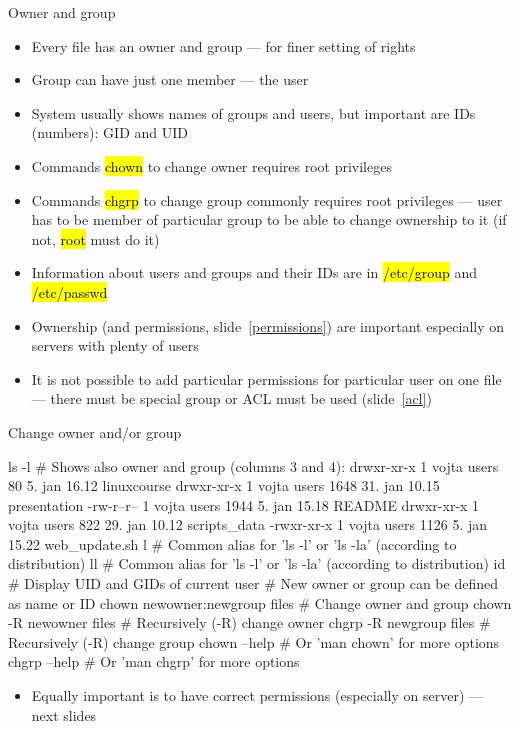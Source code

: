 \documentclass[compress, ucs, xelatex, 11pt, xcolor=svgnames, aspectratio=169,
	hyperref={
		bookmarks=true,
		unicode=true,
		colorlinks=true,
		pdftitle={Linux, command line and MetaCentrum},
		plainpages=false,
		pdfauthor={Vojtech Zeisek},
		pdfsubject={Course about use of Linux command line, writing shell scripts and using MetaCentrum of CESNET},
		pdfcreator={XeLaTeX},
		pdfkeywords={Linux, GNU, BASH, shell, command line, MetaCentrum},
		linkcolor=DarkRed, %
		anchorcolor=DarkBlue, %
		citecolor=Indigo, %
		filecolor=NavyBlue, %
		menucolor=DarkMagenta, %
		urlcolor=DarkBlue, %
		pdftex},
	url={hyphens, lowtilde} %
	]{beamer}
\renewcommand{\texttt}[1]{\hl{\ttfamily #1}}
\begin{document}
\begin{frame}{Owner and group}
	\begin{itemize}
		\item Every file has an owner and group --- for finer setting of rights
		\item Group can have just one member --- the user
		\item System usually shows names of groups and users, but important are IDs (numbers): GID and UID
		\item Commands \texttt{chown} to change owner requires root privileges
		\item Commands \texttt{chgrp} to change group commonly requires root privileges --- user has to be member of particular group to be able to change ownership to it (if not, \texttt{root} must do it)
		\item Information about users and groups and their IDs are in \texttt{/etc/group} and \texttt{/etc/passwd}
		\item Ownership (and permissions, slide~\ref{permissions}) are important especially on servers with plenty of users
		\item It is not possible to add particular permissions for particular user on one file --- there must be special group or ACL must be used (slide~\ref{acl})
	\end{itemize}
\end{frame}

\begin{frame}[fragile]{Change owner and/or group}
	\begin{bashcode}
    ls -l # Shows also owner and group (columns 3 and 4):
    drwxr-xr-x 1 vojta users    80  5. jan 16.12 linuxcourse
    drwxr-xr-x 1 vojta users  1648 31. jan 10.15 presentation
    -rw-r--r-- 1 vojta users  1944  5. jan 15.18 README
    drwxr-xr-x 1 vojta users   822 29. jan 10.12 scripts_data
    -rwxr-xr-x 1 vojta users  1126  5. jan 15.22 web_update.sh
    l # Common alias for 'ls -l' or 'ls -la' (according to distribution)
    ll # Common alias for 'ls -l' or 'ls -la' (according to distribution)
    id # Display UID and GIDs of current user
    # New owner or group can be defined as name or ID
    chown newowner:newgroup files # Change owner and group
    chown -R newowner files # Recursively (-R) change owner
    chgrp -R newgroup files # Recursively (-R) change group
    chown --help # Or 'man chown' for more options
    chgrp --help # Or 'man chgrp' for more options
	\end{bashcode}
	\begin{itemize}
		\item Equally important is to have correct permissions (especially on server) --- next slides
	\end{itemize}
\end{frame}
\end{document}
